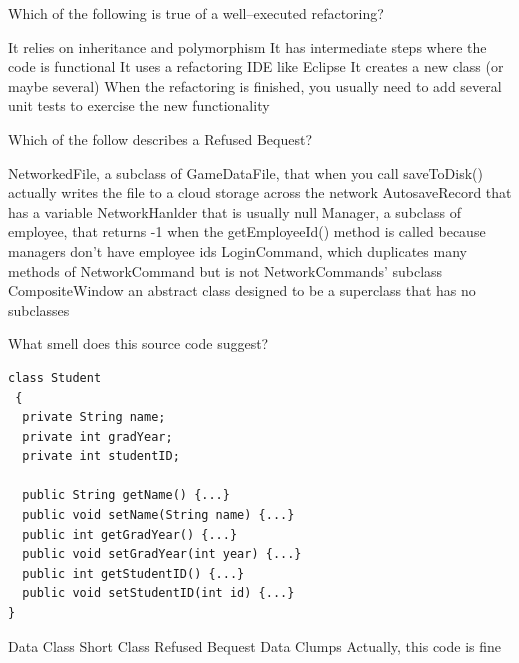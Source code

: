 \documentclass{exam}
\begin{document}
\begin{questions}
\question[1]

Which of the following is true of a well--executed refactoring?

\begin{choices}
\choice It relies on inheritance and polymorphism
\correctchoice It has intermediate steps where the code is functional
\choice It uses a refactoring IDE like Eclipse
\choice It creates a new class (or maybe several)
\choice When the refactoring is finished, you usually need to add several unit tests to exercise the new functionality
\end{choices}

\question[1]
Which of the follow describes a Refused Bequest?

\begin{choices}
\choice NetworkedFile, a subclass of GameDataFile, that when you call saveToDisk() actually writes the file to a cloud storage across the network
\choice AutosaveRecord that has a variable NetworkHanlder that is usually null
\correctchoice Manager, a subclass of employee, that returns -1 when the getEmployeeId() method is called because managers don't have employee ids
\choice LoginCommand, which duplicates many methods of NetworkCommand but is not NetworkCommands' subclass
\choice CompositeWindow an abstract class designed to be a superclass that has no subclasses
\end{choices}

\question[1] What smell does this source code suggest?

\begin{lstlisting}
class Student
 {
  private String name;
  private int gradYear;
  private int studentID;

  public String getName() {...}
  public void setName(String name) {...}
  public int getGradYear() {...}
  public void setGradYear(int year) {...}
  public int getStudentID() {...}
  public void setStudentID(int id) {...}
}
\end{lstlisting}

\begin{choices}
\correctchoice Data Class
\choice Short Class
\choice Refused Bequest
\choice Data Clumps
\choice Actually, this code is fine
\end{choices}




\end{questions}
\end{document}
